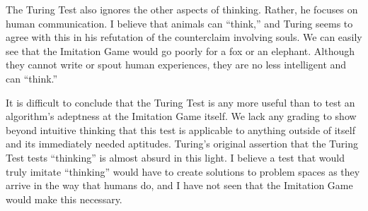 \documentclass[11pt]{article}
\begin{document}
The Turing Test also ignores the other aspects of thinking. Rather, he focuses on human communication. I believe that animals can ``think,'' and Turing seems to agree with this in his refutation of the counterclaim involving souls. We can easily see that the Imitation Game would go poorly for a fox or an elephant. Although they cannot write or spout human experiences, they are no less intelligent and can ``think.''

It is difficult to conclude that the Turing Test is any more useful than to test an algorithm's adeptness at the Imitation Game itself. We lack any grading to show beyond intuitive thinking that this test is applicable to anything outside of itself and its immediately needed aptitudes. Turing's original assertion that the Turing Test tests ``thinking'' is almost absurd in this light. I believe a test that would truly imitate ``thinking'' would have to create solutions to problem spaces as they arrive in the way that humans do, and I have not seen that the Imitation Game would make this necessary.
\end{document}
